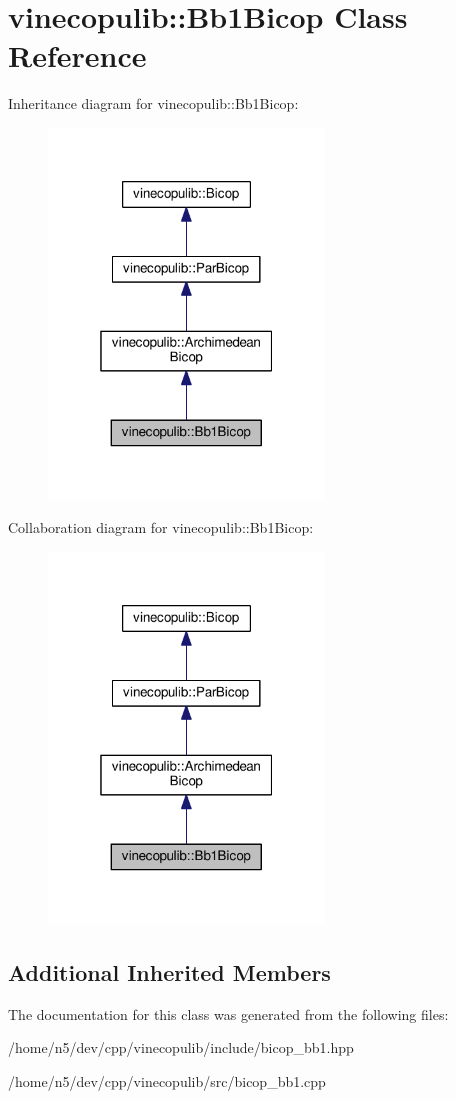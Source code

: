 \hypertarget{classvinecopulib_1_1_bb1_bicop}{}\section{vinecopulib\+:\+:Bb1\+Bicop Class Reference}
\label{classvinecopulib_1_1_bb1_bicop}


Inheritance diagram for vinecopulib\+:\+:Bb1\+Bicop\+:\nopagebreak
\begin{figure}[H]
\begin{center}
\leavevmode
\includegraphics[width=208pt]{classvinecopulib_1_1_bb1_bicop__inherit__graph}
\end{center}
\end{figure}


Collaboration diagram for vinecopulib\+:\+:Bb1\+Bicop\+:\nopagebreak
\begin{figure}[H]
\begin{center}
\leavevmode
\includegraphics[width=208pt]{classvinecopulib_1_1_bb1_bicop__coll__graph}
\end{center}
\end{figure}
\subsection*{Additional Inherited Members}


The documentation for this class was generated from the following files\+:\begin{DoxyCompactItemize}
\item 
/home/n5/dev/cpp/vinecopulib/include/bicop\+\_\+bb1.\+hpp\item 
/home/n5/dev/cpp/vinecopulib/src/bicop\+\_\+bb1.\+cpp\end{DoxyCompactItemize}

